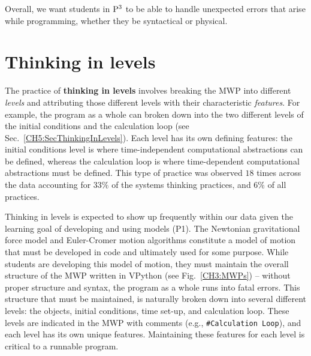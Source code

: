 \documentclass{msuphddissertation}
\begin{document}
\begin{doublespace}
\begin{appendices}
Overall, we want students in ${\rm P}^{3}$ to be able to handle unexpected errors that arise while programming, whether they be syntactical or physical.

\section*{Thinking in levels}

The practice of \textbf{thinking in levels} involves breaking the MWP into different \textit{levels} and attributing those different levels with their characteristic \textit{features}.  For example, the program as a whole can broken down into the two different levels of the initial conditions and the calculation loop (see Sec.~\ref{CH5:SecThinkingInLevels}).  Each level has its own defining features: the initial conditions level is where time-independent computational abstractions can be defined, whereas the calculation loop is where time-dependent computational abstractions must be defined.  This type of practice was observed $18$ times across the data  accounting for $33\%$ of the systems thinking practices, and $6\%$ of all practices.

Thinking in levels is expected to show up frequently within our data given the learning goal of developing and using models (P1).  The Newtonian gravitational force model and Euler-Cromer motion algorithms constitute a model of motion that must be developed in code and ultimately used for some purpose.  While students are developing this model of motion, they must maintain the overall structure of the MWP written in VPython (see Fig.~\ref{CH3:MWPs}) -- without proper structure and syntax, the program as a whole runs into fatal errors.  This structure that must be maintained, is naturally broken down into several different levels: the objects, initial conditions, time set-up, and calculation loop.  These levels are indicated in the MWP with comments (e.g., \texttt{\#Calculation Loop}), and each level has its own unique features.  Maintaining these features for each level is critical to a runnable program.


\end{appendices}
\end{doublespace}
\end{document}
